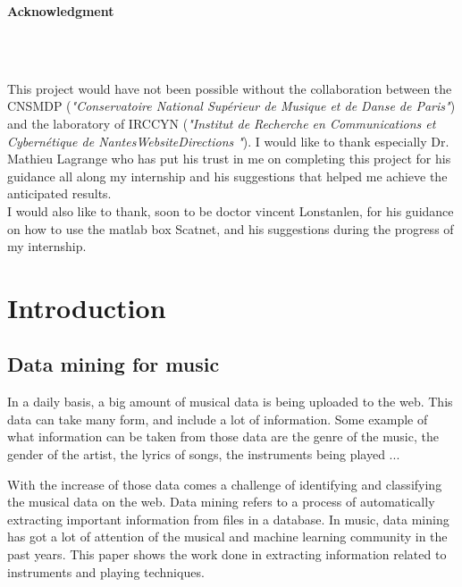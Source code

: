 \documentclass[hidelinks,12pt]{report}
\begin{document}
\begin{center}
\begin{large}
\textbf{Acknowledgment} 
\end{large}\\~\\
\end{center}
\par This project would have not been possible without the collaboration between the CNSMDP  (\textit{"Conservatoire National Supérieur de Musique et de Danse de Paris"}) and the laboratory of IRCCYN (\textit{"Institut de Recherche en Communications et Cybernétique de NantesWebsiteDirections
"}). I would like to thank especially Dr. Mathieu Lagrange who has put his trust in me on completing this project for his guidance all along my internship and his suggestions that helped me achieve the anticipated results.\\ I would also like to thank, soon to be doctor vincent Lonstanlen, for his guidance on how to use the matlab box Scatnet, and his suggestions during the progress of my internship.
\thispagestyle{empty}
\newpage
\tableofcontents
\thispagestyle{empty}
\newpage
\clearpage
\thispagestyle{empty}
\newpage
\listoffigures
\thispagestyle{empty}
\newpage
\clearpage
\setcounter{page}{1}
\noindent




\chapter{Introduction}
\section{Data mining for music}
In a daily basis, a big amount of musical data is being uploaded to the web. This data can take many form, and include a lot of information. Some example of what information can be taken from those data are the genre of the music, the gender of the artist, the lyrics of songs, the instruments being played ...\par
With the increase of those data comes a challenge of identifying and classifying the musical data on the web. Data mining refers to a process of automatically extracting important information from files in a database. In music, data mining has got a lot of attention of the musical and machine learning community in the past years. This paper shows the work done in extracting information related to instruments and playing techniques.
\end{document}
